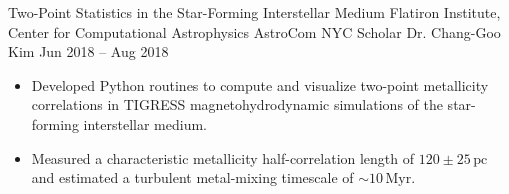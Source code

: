 \researchentry
  {Two-Point Statistics in the Star-Forming Interstellar Medium}
  {Flatiron Institute, Center for Computational Astrophysics}
  {AstroCom NYC Scholar}
  {Dr. Chang-Goo Kim}
  {Jun 2018 -- Aug 2018}
  {}

\begin{itemize}[
  leftmargin=1em,
  label={--},
  itemsep=3pt,
  topsep=0pt,
  parsep=0pt,
  partopsep=0pt
]
\item Developed Python routines to compute and visualize two-point
metallicity correlations in TIGRESS magnetohydrodynamic simulations of the
star-forming interstellar medium.

\item Measured a characteristic metallicity half-correlation length of
$120\pm25\,\mathrm{pc}$ and estimated a turbulent metal-mixing timescale of
$\sim10\,\mathrm{Myr}$.
\end{itemize}
